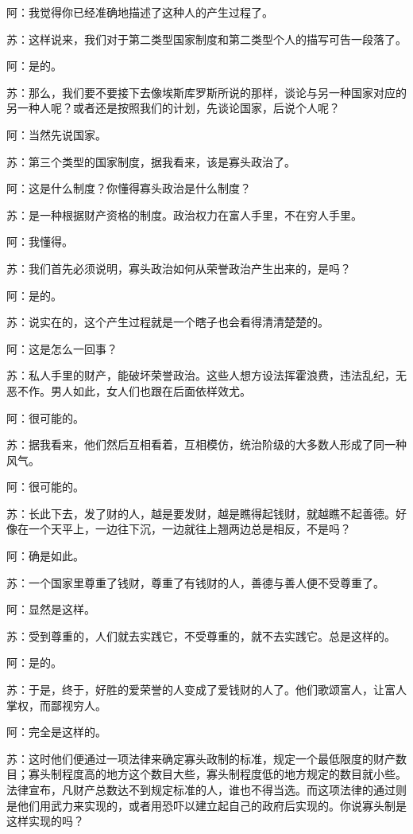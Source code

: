 \documentclass[12pt,oneside]{book}
\begin{document}
阿：我觉得你已经准确地描述了这种人的产生过程了。

苏：这样说来，我们对于第二类型国家制度和第二类型个人的描写可告一段落了。

阿：是的。

苏：那么，我们要不要接下去像埃斯库罗斯所说的那样，谈论与另一种国家对应的另一种人呢？或者还是按照我们的计划，先谈论国家，后说个人呢？

阿：当然先说国家。

苏：第三个类型的国家制度，据我看来，该是寡头政治了。

阿：这是什么制度？你懂得寡头政治是什么制度？

苏：是一种根据财产资格的制度。政治权力在富人手里，不在穷人手里。

阿：我懂得。

苏：我们首先必须说明，寡头政治如何从荣誉政治产生出来的，是吗？

阿：是的。

苏：说实在的，这个产生过程就是一个瞎子也会看得清清楚楚的。

阿：这是怎么一回事？

苏：私人手里的财产，能破坏荣誉政治。这些人想方设法挥霍浪费，违法乱纪，无恶不作。男人如此，女人们也跟在后面依样效尤。

阿：很可能的。

苏：据我看来，他们然后互相看着，互相模仿，统治阶级的大多数人形成了同一种风气。

阿：很可能的。

苏：长此下去，发了财的人，越是要发财，越是瞧得起钱财，就越瞧不起善德。好像在一个天平上，一边往下沉，一边就往上翘两边总是相反，不是吗？

阿：确是如此。

苏：一个国家里尊重了钱财，尊重了有钱财的人，善德与善人便不受尊重了。

阿：显然是这样。

苏：受到尊重的，人们就去实践它，不受尊重的，就不去实践它。总是这样的。

阿：是的。

苏：于是，终于，好胜的爱荣誉的人变成了爱钱财的人了。他们歌颂富人，让富人掌权，而鄙视穷人。

阿：完全是这样的。

苏：这时他们便通过一项法律来确定寡头政制的标准，规定一个最低限度的财产数目；寡头制程度高的地方这个数目大些，寡头制程度低的地方规定的数目就小些。法律宣布，凡财产总数达不到规定标准的人，谁也不得当选。而这项法律的通过则是他们用武力来实现的，或者用恐吓以建立起自己的政府后实现的。你说寡头制是这样实现的吗？
\end{document}
